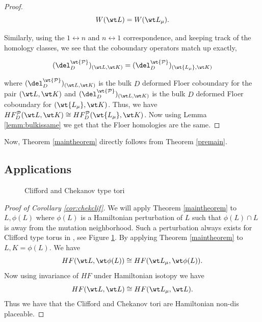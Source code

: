 \begin{proof}
\begin{equation*}
    W(\wt L) = W(\wt L_\mu).
\end{equation*}


Similarly, using the $1\leftrightarrow n$ and $n\leftrightarrow1$ correspondence, and keeping track of the homology classes, we see that the coboundary operators match up exactly,

$$(\del^{\wt {\mathcal{P}}}_D)_{(\wt L,\wt K)}  = (\del^{\wt {\mathcal{P}}}_D)_{(\wt {L_\mu} ,\wt K)}  $$

\noindent where $(\del^{\wt {\mathcal{P}}}_D)_{(\wt L,\wt K)}$ is the bulk $D$ deformed Floer coboundary for the pair $(\wt L,\wt K)$  and $(\del^{\wt {\mathcal{P}}}_D)_{(\wt L,\wt K)}$  is the bulk $D$ deformed Floer coboundary for $(\wt {L_\mu} ,\wt K)$. Thus, we have $ HF^{\mathcal{P}}_D(\wt L , \wt K) \cong HF^{\mathcal{P}}_D(\wt {L_\mu} , \wt K) $. Now using Lemma \ref{lemm:bulkissame} we get that the Floer homologies are the same.


\end{proof}

Now, Theorem \ref{maintheorem} directly follows from Theorem \ref{premain}.

\subsection{Applications}

\begin{figure}
    \centering
    \caption{Clifford and Chekanov type tori}
    \label{clifchek}
\end{figure}
\begin{proof}[Proof of Corollary \ref{cor:chekclif}]
    We will apply Theorem \ref{maintheorem} to $L,\phi(L)$ where $\phi(L)$ is a Hamiltonian perturbation of $L$ such that  $\phi(L) \cap L$ is away from the mutation neighborhood. Such a perturbation always exists for Clifford type torus in \cite{wall}, see Figure \ref{clifchek}. By applying Theorem \ref{maintheorem} to $L, K = \phi(L)$. We have 
    $$HF(\wt L , \wt \phi(L)) \cong HF (\wt L_\mu , \wt \phi(L)).$$
    Now using invariance of $HF$ under Hamiltonian isotopy we have $$HF(\wt L, \wt L) \cong HF(\wt L_\mu, \wt L).$$
    Thus we have that the Clifford and Chekanov tori are Hamiltonian non-dis placeable.
\end{proof}

